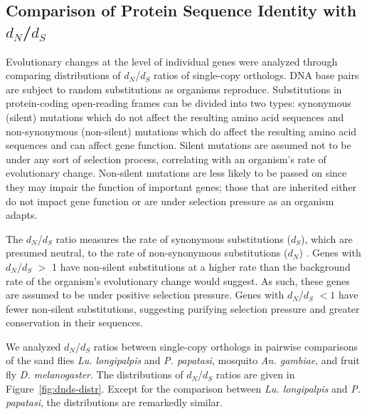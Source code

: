 \subsection{Comparison of Protein Sequence Identity with $d_N$/$d_S$}
Evolutionary changes at the level of individual genes were analyzed through comparing distributions of $d_N$/$d_S$ ratios of single-copy orthologs. DNA base pairs are subject to random substitutions as organisms reproduce.  Substitutions in protein-coding open-reading frames can be divided into two types: synonymous (silent) mutations which do not affect the resulting amino acid sequences and non-synonymous (non-silent) mutations which do affect the resulting amino acid sequences and can affect gene function.  Silent mutations are assumed not to be under any sort of selection process, correlating with an organism's rate of evolutionary change.  Non-silent mutations are less likely to be passed on since they may impair the function of important genes; those that are inherited either do not impact gene function or are under selection pressure as an organism adapts.

The $d_N$/$d_S$ ratio measures the rate of synonymous substitutions ($d_S$), which are presumed neutral, to the rate of non-synonymous substitutions ($d_N$) \cite{Kryazhimskiy2008}. Genes with $d_N$/$d_S$ $>$ 1 have non-silent substitutions at a higher rate than the background rate of the organism's evolutionary change would suggest.  As such, these genes are assumed to be under positive selection pressure.  Genes with $d_N$/$d_S$ $<1$ have fewer non-silent substitutions, suggesting purifying selection pressure and greater conservation in their sequences.

We analyzed $d_N$/$d_S$ ratios between single-copy orthologs in pairwise comparisons of the sand flies \emph{Lu. longipalpis} and \emph{P. papatasi}, mosquito \emph{An. gambiae}, and fruit fly \emph{D. melanogaster}.  The distributions of $d_N$/$d_S$ ratios are given in Figure~\ref{fig:dnds-distr}.  Except for the comparison between \emph{Lu. longipalpis} and \emph{P. papatasi}, the distributions are remarkedly similar.

